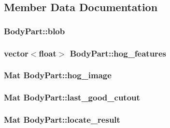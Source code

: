 \subsection{Member Data Documentation}
\hypertarget{class_body_part_a21a062ca3c7c36b43d706c364adaca5d}{
\subsubsection[{blob}]{ {\bf BodyPart::blob}}}
\label{class_body_part_a21a062ca3c7c36b43d706c364adaca5d}
\hypertarget{class_body_part_ade0cc8a87533c1b94de1e2d791524384}{
\subsubsection[{hog\_\-features}]{\setlength{\rightskip}{0pt plus 5cm}vector$<$float$>$ {\bf BodyPart::hog\_\-features}}}
\label{class_body_part_ade0cc8a87533c1b94de1e2d791524384}
\hypertarget{class_body_part_a3c20909c91e11e91f1eb62bda30d4963}{
\subsubsection[{hog\_\-image}]{\setlength{\rightskip}{0pt plus 5cm}Mat {\bf BodyPart::hog\_\-image}}}
\label{class_body_part_a3c20909c91e11e91f1eb62bda30d4963}
\hypertarget{class_body_part_af4e4c0d4c54b8e744763f5fbfcd429f7}{
\subsubsection[{last\_\-good\_\-cutout}]{\setlength{\rightskip}{0pt plus 5cm}Mat {\bf BodyPart::last\_\-good\_\-cutout}}}
\label{class_body_part_af4e4c0d4c54b8e744763f5fbfcd429f7}
\hypertarget{class_body_part_a9d7f6ec18ce64885e9bfe324a5084e6b}{
\subsubsection[{locate\_\-result}]{\setlength{\rightskip}{0pt plus 5cm}Mat {\bf BodyPart::locate\_\-result}}}
